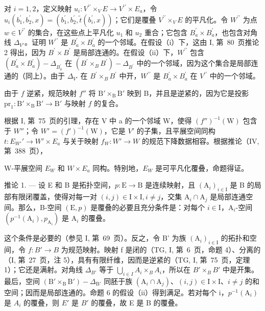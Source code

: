 对 \(i=1,2\)，定义映射 \(u_{i}\colon V^{\prime\prime}\times_{V}E\to V^{\prime\prime}\times E_{a}\)，令 \(u_{i}(b_{1}^{\prime},b_{2}^{\prime},x)=(b_{1}^{\prime},b_{2}^{\prime},\widetilde{t}(b_{i}^{\prime},x))\)；它们是覆叠 \(V^{\prime\prime}\times_{V}E\) 的平凡化。令 \(W^{\prime\prime}\) 为点 \(w\in V^{\prime\prime}\) 的集合，在这些点上平凡化 \(u_{1}\) 和 \(u_{2}\) 重合；它包含 \(B_{a}^{\prime}\times B_{a}^{\prime}\)，也包含对角线 \(\Delta_{V'}\)。证明 \(W^{\prime\prime}\) 是 \(B_{a}^{\prime}\times B_{a}^{\prime}\) 的一个邻域。在假设（i）下，这由 I, 第~80~页推论 2 得出，因为 \(B^{\prime}\times B^{\prime}\) 是局部连通的。在假设（ii）下，\(W^{\prime\prime}\) 包含 \((B_{a}^{\prime}\times B_{a}^{\prime})-\Delta_{B_{a}^{\prime}}\) 在 \((B^{\prime}\times_{B}B^{\prime})-\Delta_{B^{\prime}}\) 中的一个邻域，因为这个集合是局部连通的（同上）。由于 \(\Delta_{V'}\) 在 \(B^{\prime}\times_{B}B^{\prime}\) 中开，\(W^{\prime\prime}\) 是 \(B_{a}^{\prime}\times B_{a}^{\prime}\) 在 \(V^{\prime\prime}\) 中的一个邻域。

由于 \(f\) 逆紧，规范映射 \(f''\) 将 \(\mathrm{B}' \times_{\mathrm{B}} \mathrm{B}'\) 映到 B，并且是逆紧的，因为它是投影 \(\mathrm{pr}_{1} \colon \mathrm{B}' \times_{\mathrm{B}} \mathrm{B}' \to \mathrm{B}'\) 与映射 \(f\) 的复合。

根据 I, 第~75~页的引理，存在 V 中 a 的一个邻域 W，使得 \((f'')^{-1}(\mathrm{W})\) 包含于 \(W''\)；令 \(W'=(f')^{-1}(\mathrm{W})\)，它是 \(V'\) 的子集，且平展空间同构 \(t: E_{W'}' \to W' \times E_a\) 与关于映射 \(f_W: W' \to W\) 的规范下降数据相容。根据推论（IV, 第~388~页），

W-平展空间 \(E_{W}\) 和 \(W \times E_{a}\) 同构。特别地，\(E_{W}\) 是可平凡化覆叠，命题得证。

推论 1. --- 设 E 和 B 是拓扑空间，\(p\colon\mathrm{E}\to\mathrm{B}\) 是连续映射，且 \((\mathrm{A}_{i})_{i\in\mathrm{I}}\) 是 B 的局部有限闭覆盖，使得对每一对 \((i,j)\in\mathrm{I}\times\mathrm{I}, i\neq j\)，交集 \(\mathrm{A}_{i}\cap\mathrm{A}_{j}\) 是局部连通空间。那么，B-空间 \((\mathrm{E},p)\) 是覆叠的必要且充分条件是：对每个 \(i\in\mathrm{I}\)，\(\mathrm{A}_{i} \)-空间 \((p^{-1}(\mathrm{A}_{i}),p_{\mathrm{A}_{i}})\) 是 \(\mathrm{A}_{i}\) 的覆叠。

这个条件是必要的（参见 I, 第~69~页）。反之，令 B' 为族 \((\mathrm{A}_{i})_{i\in\mathrm{I}}\) 的拓扑和空间，令 \(f\colon B'\to B\) 为规范映射。映射 f 是闭的（TG, I, 第~6~页，命题 4）、分离的（I, 第~27~页，注 5），具有有限纤维，因而是逆紧的（TG, I, 第~75~页，定理 1）；它还是满射。对角线 \(\Delta_{B'}\) 等于 \(\bigcup_{i\in I}A_{i}\times_{B}A_{i}\)，所以在 \(B'\times_{B}B'\) 中是开集。最后，空间 \((\mathrm{B}'\times_{\mathrm{B}}\mathrm{B}')-\Delta_{\mathrm{B'}}\) 同胚于族 \((\mathrm{A}_{i}\cap\mathrm{A}_{j})\)、\((i,j)\in\mathrm{I}\times\mathrm{I}\)、\(i\neq j\) 的和空间；因而是局部连通的。命题 6 的假设（ii）得到满足。若对每个 i，\(p^{-1}(\mathrm{A}_{i})\) 是 \(A_{i}\) 的覆叠，则 \(E'\) 是 \(B'\) 的覆叠，故 E 是 B 的覆叠。

